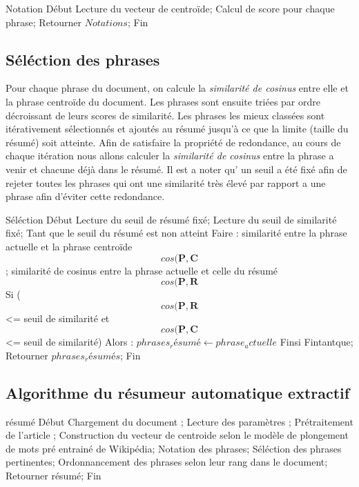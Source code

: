 \begin{algorithm}
	\begin{algorithmic}[1]
		\STATE Notation
		\STATE Début
		\STATE Lecture du vecteur de centroïde;
		\STATE Calcul de score pour chaque phrase;
		\STATE \quad Retourner $Notations$;
		\STATE Fin
	\end{algorithmic}
\end{algorithm}


\subsection{Séléction des phrases}
Pour chaque phrase du document, on calcule la \emph{similarité de cosinus} entre elle et la phrase centroïde du document. Les phrases sont ensuite triées par ordre décroissant de leurs scores de similarité. Les phrases les mieux classées sont itérativement sélectionnés et ajoutés au résumé jusqu'à ce que la limite (taille du résumé) soit atteinte. Afin de satisfaire la propriété de redondance, au cours de chaque itération nous allons calculer la \emph{similarité de cosinus} entre la phrase a venir et chacune déjà dans le résumé.
Il est a noter qu' un seuil a été fixé afin de rejeter toutes les phrases qui ont une similarité très élevé par rapport a une phrase afin d'éviter cette redondance.

\begin{algorithm}
	\begin{algorithmic}[1]
		\STATE Séléction
		\STATE Début
		\STATE Lecture du seuil de résumé fixé;
		\STATE Lecture du seuil de similarité fixé;
		\STATE Tant que le seuil du résumé est non atteint Faire :
		\STATE similarité entre la phrase actuelle et la phrase centroïde \gets \[cos(\pmb P, \pmb C\];
		\STATE similarité de cosinus entre la phrase actuelle et celle du résumé  \gets \[cos(\pmb P, \pmb R\]	
		\STATE Si (\[cos(\pmb P, \pmb R\] <= seuil de similarité et \[cos(\pmb P, \pmb C\] <= seuil de similarité) Alors :
		\STATE $phrases_résumé \gets phrase_actuelle$
		\STATE Finsi
		\STATE Fintantque;	
		\STATE \quad Retourner $phrases_résumés$;
		\STATE Fin
	\end{algorithmic}
\end{algorithm}

\subsection{Algorithme du résumeur automatique extractif}

\begin{algorithm}
	\begin{algorithmic}[1]

\STATE résumé
\STATE Début
\STATE Chargement du document ;
\STATE Lecture des paramètres ;
\STATE Prétraitement de l'article ;
\STATE Construction du vecteur de centroide selon le modèle de plongement de mots pré entrainé de Wikipédia;
\STATE Notation des phrases;
\STATE Séléction des phrases pertinentes;
\STATE Ordonnancement des phrases selon leur rang dans le document;
\STATE \quad Retourner résumé;
\STATE Fin 
   \end{algorithmic}
\end{algorithm}


